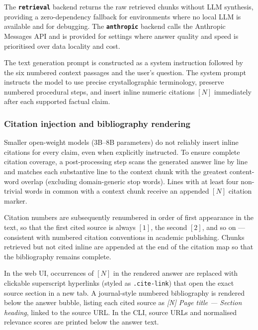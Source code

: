 The \textbf{\texttt{retrieval}} backend returns the raw retrieved
chunks without LLM synthesis, providing a zero-dependency fallback
for environments where no local LLM is available and for debugging. 
The \textbf{\texttt{anthropic}} backend calls the Anthropic Messages
API and is provided for settings where answer quality and speed is prioritised
over data locality and cost.

The text generation prompt is constructed as a system instruction followed
by the six numbered context passages and the user's question.
The system prompt instructs the model to use precise crystallographic
terminology, preserve numbered procedural steps, and insert inline
numeric citations $[N]$ immediately after each supported factual claim.

\subsubsection{Citation injection and bibliography rendering}
\label{sec:citations}

Smaller open-weight models (3B--8B parameters) do not reliably insert
inline citations for every claim, even when explicitly instructed.
To ensure complete citation coverage, a post-processing step scans the
generated answer line by line and matches each substantive line to the
context chunk with the greatest content-word overlap (excluding
domain-generic stop words).
Lines with at least four non-trivial words in common with a context
chunk receive an appended $[N]$ citation marker.

Citation numbers are subsequently renumbered in order of first
appearance in the text, so that the first cited source is always
$[1]$, the second $[2]$, and so on --- consistent with numbered
citation conventions in academic publishing.
Chunks retrieved but not cited inline are appended at the end of
the citation map so that the bibliography remains complete.

In the web UI, occurrences of $[N]$ in the rendered answer are
replaced with clickable superscript hyperlinks (styled as
\texttt{.cite-link}) that open the exact source section in a new
tab.
A journal-style numbered bibliography is rendered below the answer
bubble, listing each cited source as
\textit{[N] Page title --- Section heading}, linked to the source URL.
In the CLI, source URLs and normalised relevance scores are printed
below the answer text.

